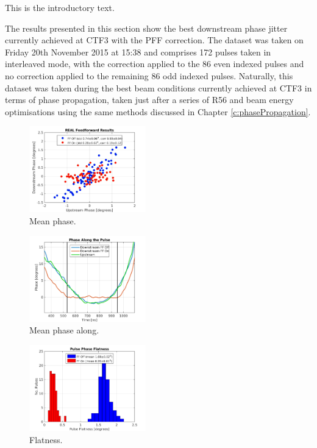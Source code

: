 
This is the introductory text.



The results presented in this section show the best downstream phase jitter currently achieved at CTF3 with the PFF correction. The dataset was taken on Friday 20th November 2015 at 15:38 and comprises 172 pulses taken in interleaved mode, with the correction applied to the 86 even indexed pulses and no correction applied to the remaining 86 odd indexed pulses. Naturally, this dataset was taken during the best beam conditions currently achieved at CTF3 in terms of phase propagation, taken just after a series of R56 and beam energy optimisations using the same methods discussed in Chapter \ref{c:phasePropagation}.

\begin{figure}
  \centering
  \includegraphics[width=0.45\textwidth]{Figures/BestFF_Real}
  \caption{Mean phase.}
  \label{f:BestFF_Real}
\end{figure}

\begin{figure}
  \centering
  \includegraphics[width=0.45\textwidth]{Figures/BestFF_MeanPhaseAlong}
  \caption{Mean phase along.}
  \label{f:BestFF_MeanPhaseAlong}
\end{figure}

\begin{figure}
  \centering
  \includegraphics[width=0.45\textwidth]{Figures/BestFF_Flatness}
  \caption{Flatness.}
  \label{f:BestFF_Flatness}
\end{figure}

